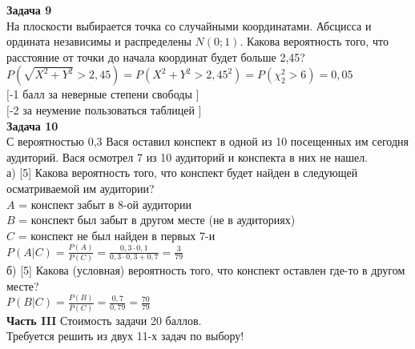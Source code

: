 \documentclass[pdftex,12pt,a4paper]{article}
\begin{document}
{\bf Задача 9} \\
На плоскости выбирается точка со случайными координатами. Абсцисса
и ордината независимы и распределены $N(0;1)$. Какова вероятность
того, что расстояние от точки до начала координат будет больше
2,45? \\
$P(\sqrt{X^{2}+Y^{2}}>2,45)=P(X^{2}+Y^{2}>2,45^{2})=P(\chi_{2}^{2}>6)=0,05$
\\
$[$-1 балл за неверные степени свободы $]$ \\
$[$-2 за неумение пользоваться таблицей $]$ \\


{\bf Задача 10} \\
С вероятностью 0,3 Вася оставил конспект в одной из 10 посещенных
им сегодня аудиторий. Вася осмотрел 7 из 10 аудиторий и конспекта
в них не нашел. \\
а) [5] Какова вероятность того, что конспект будет найден в
следующей
осматриваемой им аудитории? \\
$A$ = конспект забыт в 8-ой аудитории \\
$B$ = конспект был забыт в другом месте (не в аудиториях) \\
$C$ = конспект не был найден в первых 7-и \\
$P(A|C)=\frac{P(A)}{P(C)}=\frac{0,3\cdot 0,1}{0,3\cdot
0,3+0,7}=\frac{3}{79}$ \\
б) [5] Какова (условная) вероятность того, что конспект оставлен
где-то в другом месте? \\
$P(B|C)=\frac{P(B)}{P(C)}=\frac{0,7}{0,79}=\frac{70}{79}$ \\

{\bf Часть III} Стоимость задачи 20 баллов. \\

Требуется решить {\bf {}} из двух 11-х задач по
выбору! \\
\end{document}

